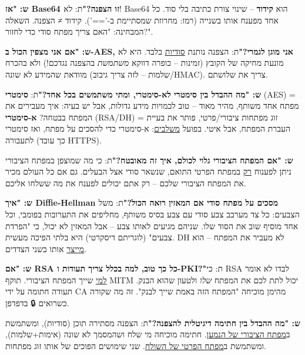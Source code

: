 \documentclass[11pt]{article}
\newcommand{\enLR}[1]{\textenglish{#1}}
\begin{document}
\textbf{ש: "אז \enLR{Base64} זו הצפנה?"}\newline ת: לא! \enLR{Base64} הוא \textbf{קידוד} – שינוי צורת כתיבה בלי סוד. כל אחד מפענח אותו בשנייה (רמז: מחרוזת שמסתיימת ב-'=='). קידוד ≠ הצפנה. השאלה המבחינה: "האם צריך מפתח סודי כדי לחזור?".\par

\textbf{ש: "אם אני מצפין הכול ב-\enLR{AES}, אני מוגן לגמרי?"}\newline ת: הצפנה נותנת \underline{סודיות} בלבד. היא לא מונעת מחיקה של הקובץ (זמינות – כופרה דווקא \emph{משתמשת} בהצפנה נגדכם!) ולא בהכרח מוודאת שהמידע לא שונה (שלמות – לזה צריך גיבוב/\enLR{HMAC).} צריך את שלושתם.\par

\textbf{ש: "מה ההבדל בין סימטרי לא-סימטרי, ומתי משתמשים בכל אחד?"}\newline ת: \textbf{סימטרי} \enLR{(AES)} = מפתח אחד משותף, מהיר מאוד – טוב לכמויות מידע גדולות, אבל יש בעיה: איך מעבירים את המפתח בבטחה? \textbf{א-סימטרי} \enLR{(RSA/DH)} = זוג מפתחות ציבורי/פרטי, פותר את בעיית העברת המפתח, אבל איטי. בפועל \underline{משלבים}: א-סימטרי כדי להסכים על מפתח, ואז סימטרי לתעבורה (כך עובד \enLR{HTTPS).}\par

\textbf{ש: "אם המפתח הציבורי גלוי לכולם, איך זה מאובטח?"}\newline ת: כי מה שמוצפן במפתח הציבורי ניתן לפענוח \underline{רק} במפתח הפרטי התואם, שנשאר סודי אצל הבעלים. גם אם כל העולם מכיר את המפתח הציבורי שלכם – רק אתם יכולים לפענח את מה ששלחו אליכם.\par

\textbf{ש: "איך \enLR{Diffie-Hellman} מסכים על מפתח סודי אם המאזין רואה הכול?"}\newline ת: משל הצבעים: כל צד מערבב צבע סודי עם צבע בסיס משותף, מחליפים את התערובות בפומבי, וכל אחד מוסיף שוב את הסוד שלו. שניהם מגיעים לאותו צבע – אבל המאזין לא יכול, כי "הפרדת צבעים" (לוגריתם דיסקרטי) היא בלתי הפיכה מעשית. \enLR{DH} לא מעביר את המפתח – הוא \underline{מייצר} אותו בשני הצדדים.\par

\textbf{ש: "אם \enLR{RSA} כל כך טוב, למה בכלל צריך תעודות ו-\enLR{PKI}?"}\newline ת: כי \enLR{RSA} לבדו לא אומר \underline{למי} שייך המפתח הציבורי. תוקף \enLR{MITM} יכול לתת לכם את המפתח \emph{שלו} ולטעון שהוא הבנק. תעודה חתומה על ידי \enLR{CA} מהימן מוכיחה "המפתח הזה באמת שייך לבנק". זה מה שקורה כשרואים 🔒 בדפדפן.\par

\textbf{ש: "מה ההבדל בין חתימה דיגיטלית להצפנה?"}\newline ת: הצפנה מסתירה תוכן (סודיות), ומשתמשת ב\underline{מפתח הציבורי של הנמען}. חתימה מוכיחה מי שלח ושהמסמך לא שונה (אימות+שלמות), ומשתמשת ב\underline{מפתח הפרטי של השולח}. שני שימושים הפוכים של אותו זוג מפתחות.\par
\end{document}
